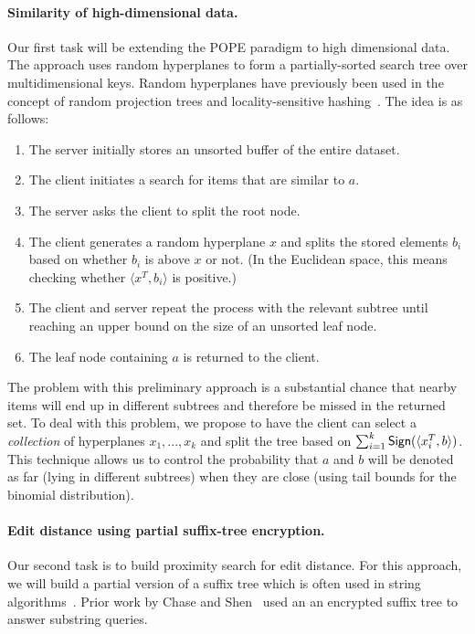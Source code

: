 \paragraph{Similarity of high-dimensional data.}
Our first task will be extending the POPE
paradigm to high dimensional data.  The approach uses random hyperplanes
to form a partially-sorted search tree over multidimensional keys.
Random hyperplanes
have previously been used in the concept of random projection trees and
locality-sensitive hashing~\cite{STOC:DasFre08,charikar2002similarity}.  The
idea is as follows:

\begin{enumerate}\setlength\itemsep{0em}
\item The server initially stores an unsorted buffer of the entire dataset.
\item The client initiates a search for items that are similar to $a$.
\item The server asks the client to split the root node.
\item The client generates a random hyperplane $x$ and splits 
  the stored elements $b_i$ based on whether $b_i$ is above $x$ or not.  (In
    the Euclidean space, this means checking whether $\langle x^T,b_i \rangle$
    is positive.)
\item The client and server repeat the process with the relevant subtree
  until reaching an upper bound on the size of an unsorted leaf node.
\item The leaf node containing $a$ is returned to the client.
\end{enumerate}

The problem with this preliminary approach is a substantial chance that
nearby items will end up in different subtrees and therefore be
missed in the returned set.
To deal with this
problem, we propose to have the client can select a \emph{collection}
of hyperplanes $x_1,..., x_k$ and
split the tree based on $\sum_{i=1}^k \mathsf{Sign}( \langle x_i^T, b \rangle )$.  This
technique allows us to control the probability that $a$ and $b$ will be denoted
as far (lying in different subtrees) when they are close (using tail bounds for
the binomial distribution). %

\paragraph{Edit distance using partial suffix-tree encryption.}
Our second task is to build proximity search for edit distance.  For this
approach, we will build a partial version of a suffix tree which is often used
in string algorithms~\cite{mccreight1976space}.  Prior work by Chase and
Shen~\cite{chase2015substring} used an an encrypted suffix tree to answer
substring queries.

